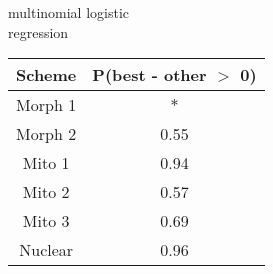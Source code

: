 \begin{subtable}[b]{0.3\linewidth}
  \caption{multinomial logistic\\regression}
  \centering
  \begin{tabular}{ c c }
    \hline
    Scheme & P(best - other \(>\) 0) \\ 
    \hline
    \hline
    Morph 1 & \(\ast\) \\ 
    Morph 2 & 0.55 \\ 
    Mito 1 & 0.94 \\ 
    Mito 2 & 0.57 \\ 
    Mito 3 & 0.69 \\ 
    Nuclear & 0.96 \\ 
    \hline
  \end{tabular}
  \label{mmdif}
\end{subtable}
